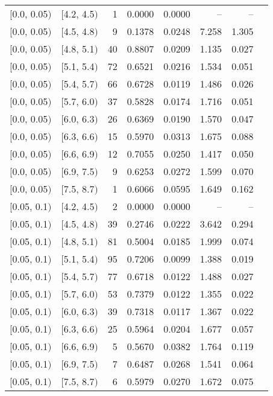 \begin{longtable}{| l | l | r | r | r | r | r | r |}
        $[$0.0, 0.05$)$ & $[$4.2, 4.5$)$ & 1   & 0.0000 & 0.0000 & -- & -- \\
        $[$0.0, 0.05$)$ & $[$4.5, 4.8$)$ & 9   & 0.1378 & 0.0248 & 7.258 & 1.305 \\
        $[$0.0, 0.05$)$ & $[$4.8, 5.1$)$ & 40  & 0.8807 & 0.0209 & 1.135 & 0.027 \\
        $[$0.0, 0.05$)$ & $[$5.1, 5.4$)$ & 72  & 0.6521 & 0.0216 & 1.534 & 0.051 \\
        $[$0.0, 0.05$)$ & $[$5.4, 5.7$)$ & 66  & 0.6728 & 0.0119 & 1.486 & 0.026 \\
        $[$0.0, 0.05$)$ & $[$5.7, 6.0$)$ & 37  & 0.5828 & 0.0174 & 1.716 & 0.051 \\
        $[$0.0, 0.05$)$ & $[$6.0, 6.3$)$ & 26  & 0.6369 & 0.0190 & 1.570 & 0.047 \\
        $[$0.0, 0.05$)$ & $[$6.3, 6.6$)$ & 15  & 0.5970 & 0.0313 & 1.675 & 0.088 \\
        $[$0.0, 0.05$)$ & $[$6.6, 6.9$)$ & 12  & 0.7055 & 0.0250 & 1.417 & 0.050 \\
        $[$0.0, 0.05$)$ & $[$6.9, 7.5$)$ & 9   & 0.6253 & 0.0272 & 1.599 & 0.070 \\
        $[$0.0, 0.05$)$ & $[$7.5, 8.7$)$ & 1   & 0.6066 & 0.0595 & 1.649 & 0.162 \\
        $[$0.05, 0.1$)$ & $[$4.2, 4.5$)$ & 2   & 0.0000 & 0.0000 & -- & -- \\
        $[$0.05, 0.1$)$ & $[$4.5, 4.8$)$ & 39  & 0.2746 & 0.0222 & 3.642 & 0.294 \\
        $[$0.05, 0.1$)$ & $[$4.8, 5.1$)$ & 81  & 0.5004 & 0.0185 & 1.999 & 0.074 \\
        $[$0.05, 0.1$)$ & $[$5.1, 5.4$)$ & 95  & 0.7206 & 0.0099 & 1.388 & 0.019 \\
        $[$0.05, 0.1$)$ & $[$5.4, 5.7$)$ & 77  & 0.6718 & 0.0122 & 1.488 & 0.027 \\
        $[$0.05, 0.1$)$ & $[$5.7, 6.0$)$ & 53  & 0.7379 & 0.0122 & 1.355 & 0.022 \\
        $[$0.05, 0.1$)$ & $[$6.0, 6.3$)$ & 39  & 0.7318 & 0.0117 & 1.367 & 0.022 \\
        $[$0.05, 0.1$)$ & $[$6.3, 6.6$)$ & 25  & 0.5964 & 0.0204 & 1.677 & 0.057 \\
        $[$0.05, 0.1$)$ & $[$6.6, 6.9$)$ & 5   & 0.5670 & 0.0382 & 1.764 & 0.119 \\
        $[$0.05, 0.1$)$ & $[$6.9, 7.5$)$ & 7   & 0.6487 & 0.0268 & 1.541 & 0.064 \\
        $[$0.05, 0.1$)$ & $[$7.5, 8.7$)$ & 6   & 0.5979 & 0.0270 & 1.672 & 0.075 \\

\end{longtable}
